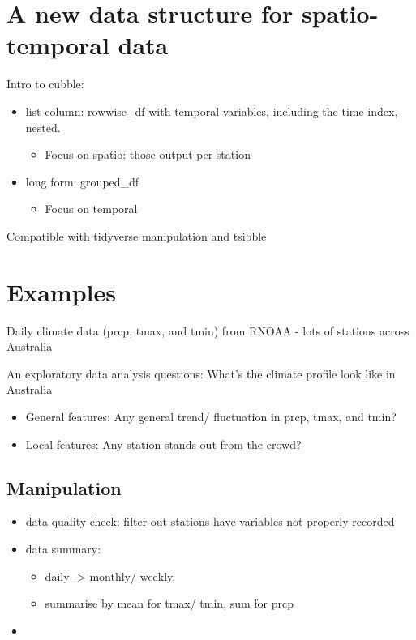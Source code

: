 \documentclass{article}
\begin{document}
\hypertarget{a-new-data-structure-for-spatio-temporal-data}{%
\section{A new data structure for spatio-temporal
data}\label{a-new-data-structure-for-spatio-temporal-data}}

Intro to cubble:

\begin{itemize}
\tightlist
\item
  list-column: rowwise\_df with temporal variables, including the time
  index, nested.

  \begin{itemize}
  \tightlist
  \item
    Focus on spatio: those output per station
  \end{itemize}
\item
  long form: grouped\_df

  \begin{itemize}
  \tightlist
  \item
    Focus on temporal
  \end{itemize}
\end{itemize}

Compatible with tidyverse manipulation and tsibble

\hypertarget{examples}{%
\section{Examples}\label{examples}}

Daily climate data (prcp, tmax, and tmin) from RNOAA - lots of stations
across Australia

An exploratory data analysis questions: What's the climate profile look
like in Australia

\begin{itemize}
\tightlist
\item
  General features: Any general trend/ fluctuation in prcp, tmax, and
  tmin?
\item
  Local features: Any station stands out from the crowd?
\end{itemize}

\hypertarget{manipulation}{%
\subsection{Manipulation}\label{manipulation}}

\begin{itemize}
\tightlist
\item
  data quality check: filter out stations have variables not properly
  recorded
\item
  data summary:

  \begin{itemize}
  \tightlist
  \item
    daily -\textgreater{} monthly/ weekly,
  \item
    summarise by mean for tmax/ tmin, sum for prcp
  \end{itemize}
\item
\end{itemize}
\end{document}
